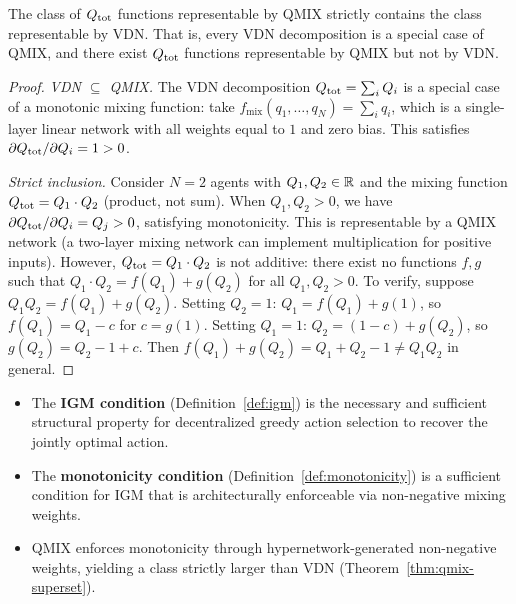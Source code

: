 \documentclass[11pt,a4paper]{article}
\begin{document}
\begin{theorem}
\label{thm:qmix-superset}
The class of $Q_{\mathrm{tot}}$ functions representable by QMIX strictly
contains the class representable by VDN.  That is, every VDN
decomposition is a special case of QMIX, and there exist $Q_{\mathrm{tot}}$
functions representable by QMIX but not by VDN.
\end{theorem}

\begin{proof}
\emph{VDN $\subseteq$ QMIX.}  The VDN decomposition
$Q_{\mathrm{tot}} = \sum_i Q_i$ is a special case of a monotonic mixing
function: take $f_{\mathrm{mix}}(q_1, \ldots, q_N) =
\sum_i q_i$, which is a single-layer linear network with all
weights equal to $1$ and zero bias.  This satisfies $\partial
Q_{\mathrm{tot}} / \partial Q_i = 1 > 0$.

\emph{Strict inclusion.}  Consider $N = 2$ agents with
$Q_1, Q_2 \in \mathbb{R}$ and the mixing function
$Q_{\mathrm{tot}} = Q_1 \cdot Q_2$ (product, not sum).  When $Q_1, Q_2 > 0$,
we have $\partial Q_{\mathrm{tot}} / \partial Q_i = Q_j > 0$, satisfying
monotonicity.  This is representable by a QMIX network (a
two-layer mixing network can implement multiplication for
positive inputs).  However, $Q_{\mathrm{tot}} = Q_1 \cdot Q_2$ is not
additive: there exist no functions $f, g$ such that
$Q_1 \cdot Q_2 = f(Q_1) + g(Q_2)$ for all $Q_1, Q_2 > 0$.
To verify, suppose $Q_1 Q_2 = f(Q_1) + g(Q_2)$.  Setting
$Q_2 = 1$: $Q_1 = f(Q_1) + g(1)$, so $f(Q_1) = Q_1 - c$
for $c = g(1)$.  Setting $Q_1 = 1$: $Q_2 = (1 - c) + g(Q_2)$,
so $g(Q_2) = Q_2 - 1 + c$.  Then $f(Q_1) + g(Q_2) =
Q_1 + Q_2 - 1 \neq Q_1 Q_2$ in general.
\end{proof}

\begin{keyresult}[title={IGM and Monotonic Value Factorization}]
\begin{itemize}[nosep]
  \item The \textbf{IGM condition} (Definition~\ref{def:igm})
    is the necessary and sufficient structural property for
    decentralized greedy action selection to recover the jointly
    optimal action.
  \item The \textbf{monotonicity condition} (Definition~\ref{def:monotonicity})
    is a sufficient condition for IGM that is architecturally
    enforceable via non-negative mixing weights.
  \item QMIX enforces monotonicity through hypernetwork-generated
    non-negative weights, yielding a class strictly larger than
    VDN (Theorem~\ref{thm:qmix-superset}).
\end{itemize}
\end{keyresult}
\end{document}
